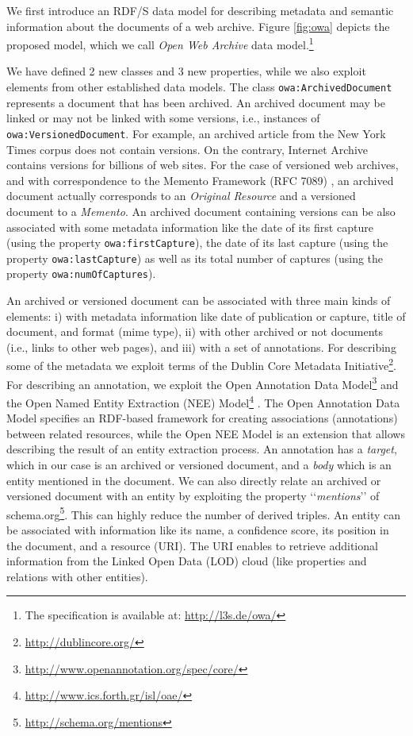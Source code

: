 \documentclass[twocolumn]{svjour3}
\newcommand{\q}[1]{\lq\lq{}{}#1\rq\rq{}{}}
\begin{document}
We first introduce an RDF/S data model
for describing metadata and semantic information about the documents of a web archive.
Figure \ref{fig:owa} depicts the proposed model,
which we call {\em Open Web Archive} data model.\footnote{The specification
 is available at: \url{http://l3s.de/owa/}}

We have defined 2 new classes and 3 new properties,
while we also exploit elements from other established data models.
The class {\tt owa:Archi\-ved\-Do\-cu\-ment} represents a document that has been archived.
An archived document may be linked or may not be linked with some versions,
i.e., instances of {\tt owa:Ve\-rsio\-ned\-Do\-cu\-ment}.
For example, an archi\-ved article from the
New York Times corpus \cite{sandhaus2008new} does not contain versions.
On the contrary,
Internet Archive
contains versions for billions of web sites.
For the case of versioned web archives,
and with correspondence to the Memento Framework (RFC 7089) \cite{van2013rfc},
an archived document actually corresponds to an {\em Original Resource}
and a versioned document to a {\em Memento}.
An archived document containing versions can be also associated with some metadata information
like the date of its first capture (using the property {\tt owa:firstCapture}),
the date of its last capture (using the property {\tt owa:lastCapture}) as well as
its total number of captures (using the property {\tt owa:numOfCaptures}).

An archived or versioned document
can be associated with three main kinds of elements:
i) with metadata information like date of publication or capture,
title of document, and format (mime type),
ii) with other archived or not documents (i.e., links to other web pages), and
iii) with a set of annotations.
For describing some of the metadata we exploit terms of the
Dublin Core Metadata Initiative\footnote{\url{http://dublincore.org/}}.
For describing an annotation, we exploit
the Open Annotation Data Model\footnote{\url{http://www.openannotation.org/spec/core/}} \cite{sanderson2013open}
and the Open Named Entity Extraction (NEE) Model\footnote{\url{http://www.ics.forth.gr/isl/oae/}} \cite{fafalios2015ijait}.
The Open Annotation Data Model specifies an RDF-based framework for creating associations (annotations)
between related resources, while the Open NEE Model is an extension
that allows describing the result of an entity extraction process.
An annotation has a {\em target}, which in our case is an archived or versioned document, and
a {\em body} which is an entity mentioned in the document.
We can also directly relate an archived or versioned document with an
entity by exploiting the property \q{{\em mentions}}
of schema.org\footnote{\url{http://schema.org/mentions}}.
This can highly reduce the number of derived triples.
An entity can be associated with information like
its name, a confidence score, its position in the document, and a resource (URI).
The URI enables to retrieve additional information from the Linked Open Data (LOD)
cloud \cite{heath2011linked} (like properties and relations with other entities).
\end{document}
